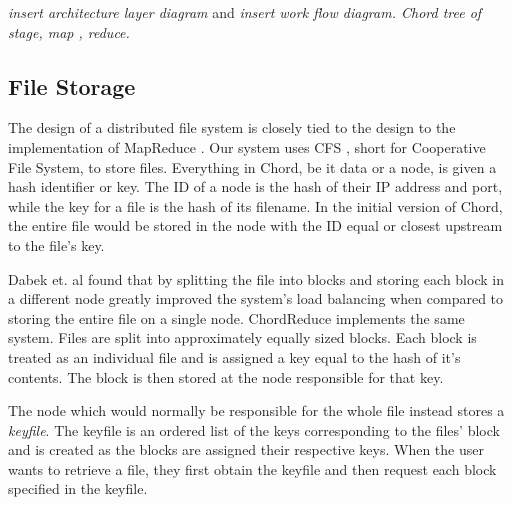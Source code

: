 \textit{insert architecture layer diagram }  and \textit{insert work flow diagram.  Chord tree of stage, map , reduce.}




\subsection{File Storage}
The design of a distributed file system is closely tied to the design to the implementation of MapReduce \cite{gfs} \cite{hdfs}.  Our system uses CFS \cite{CFS}, short for Cooperative File System, to store files.  Everything in Chord, be it data or a node, is given a hash identifier or key. The ID of a node is the hash of their IP address and port, while the key for a file is the hash of its filename.  In the initial version of Chord, the entire file would be stored in the node with the ID equal or closest upstream to the file's key.

Dabek et. al found that by splitting the file into blocks and storing each block in a different node greatly improved the system's load balancing when compared to storing the entire file on a single node\cite{CFS}. ChordReduce implements the same system.  Files are split into approximately equally sized blocks.  Each block is treated as an individual file and is assigned a key equal to the hash of it's contents.  The block is then stored at the node responsible for that key.  

The node which would normally be responsible for the whole file instead stores a \textit{keyfile}.  The keyfile is an ordered list of the keys corresponding to the files' block and is created as the blocks are assigned their respective keys.  When the user wants to retrieve a file, they first obtain the keyfile and then request each block specified in the keyfile.

